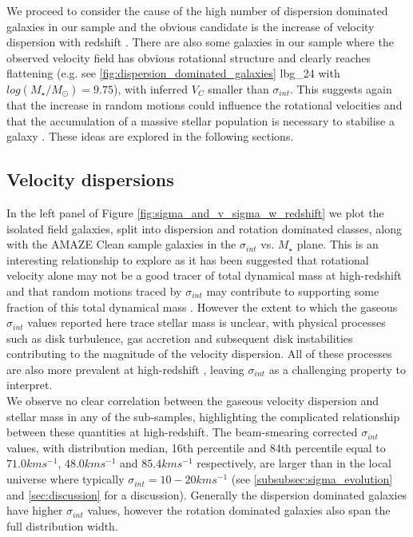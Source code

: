 \documentclass[fleqn,usenatbib]{mn2e}
\begin{document}
We proceed to consider the cause of the high number of dispersion dominated galaxies in our sample and the obvious candidate is the increase of velocity dispersion with redshift \citep[e.g.][]{Genzel2006,Genzel2008,ForsterSchreiber2009,Law2009,Gnerucci2011,Epinat2012,Wisnioski2015}.
There are also some galaxies in our sample where the observed velocity field has obvious rotational structure and clearly reaches flattening (e.g. see \cref{fig:dispersion_dominated_galaxies} lbg\_24 with $log(M_{\star}/M_{\odot})=9.75$), with inferred $V_{C}$ smaller than $\sigma_{int}$.
This suggests again that the increase in random motions could influence the rotational velocities and that the accumulation of a massive stellar population is necessary to stabilise a galaxy \citep[e.g.][]{Law2009,Law2012b,Law2012c,Newman2013,Wisnioski2015}.
These ideas are explored in the following sections.

\subsection{Velocity dispersions}\label{subsec:results_velocity_dispersions}

In the left panel of Figure \ref{fig:sigma_and_v_sigma_w_redshift} we plot the isolated field galaxies, split into dispersion and rotation dominated classes, along with the AMAZE Clean sample galaxies in the $\sigma_{int}$ vs. $M_{\star}$ plane.
This is an interesting relationship to explore as it has been suggested that rotational velocity alone may not be a good tracer of total dynamical mass at high-redshift and that random motions traced by $\sigma_{int}$ may contribute to supporting some fraction of this total dynamical mass \citep[e.g.][]{Kassin2007,Burkert2010,Kassin2012,Law2012b,Law2012c,Ubler2017,Genzel2017}.
However the extent to which the gaseous $\sigma_{int}$ values reported here trace stellar mass is unclear, with physical processes such as disk turbulence, gas accretion and subsequent disk instabilities contributing to the magnitude of the velocity dispersion.
All of these processes are also more prevalent at high-redshift \citep{Genzel2006,ForsterSchreiber2009,Law2009,Genzel2011,Wisnioski2015,Wuyts2016b}, leaving $\sigma_{int}$ as a challenging property to interpret. \\ 

We observe no clear correlation between the gaseous velocity dispersion and stellar mass in any of the sub-samples, highlighting the complicated relationship between these quantities at high-redshift.
The beam-smearing corrected $\sigma_{int}$ values, with distribution median, 16th percentile and 84th percentile equal to $71.0kms^{-1}$, $48.0kms^{-1}$ and $85.4kms^{-1}$ respectively, are larger than in the local universe where typically $\sigma_{int} = 10-20kms^{-1}$ \citep{Epinat2008a} (see \cref{subsubsec:sigma_evolution} and \cref{sec:discussion} for a discussion).
Generally the dispersion dominated galaxies have higher $\sigma_{int}$ values, however the rotation dominated galaxies also span the full distribution width.
\end{document}
